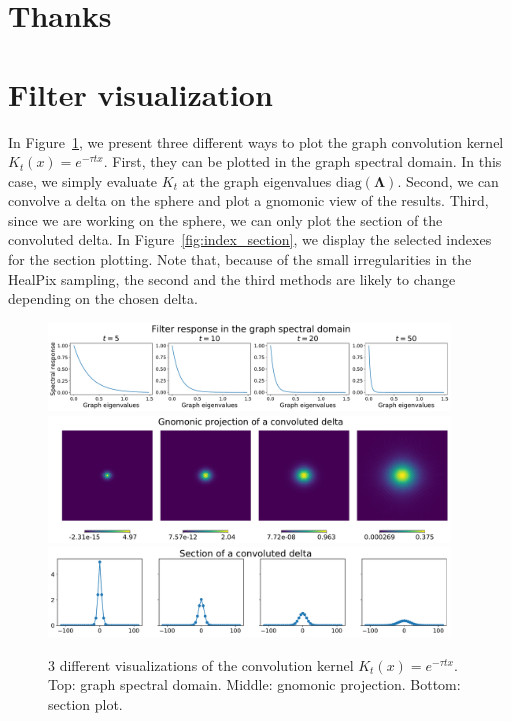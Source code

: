 \documentclass[final,twocolumn,3p,times,authoryear]{elsarticle}
\renewcommand{\b}[1]{{\bm{#1}}}   %
\newcommand{\1}{\b{1}}              %
\newcommand{\0}{\b{0}}              %
\newcommand{\bLambda}{\b{\Lambda}}
\begin{document}
\section*{Thanks}

\appendix

\section{Filter visualization}
\label{app:filter_visualization}

In Figure~\ref{fig:gaussian_filters_visualization}, we present three different
ways to plot the graph convolution kernel $K_t(x)=e^{-\tau t x}$. First, they can
be plotted in the graph spectral domain. In this case, we simply evaluate $K_t$
at the graph eigenvalues $\text{diag}(\bLambda)$. Second, we can convolve a
delta on the sphere and plot a gnomonic view of the results. Third, since we are
working on the sphere, we can only plot the section of the convoluted delta. In
Figure~\ref{fig:index_section}, we display the selected indexes for the section
plotting. Note that, because of the small irregularities in the HealPix
sampling, the second and the third methods are likely to change depending on the
chosen delta.

\begin{figure}[!ht]
\centering
\includegraphics[width=0.95\textwidth]{figures/gaussian_filters_spectral.pdf}
\includegraphics[width=0.95\textwidth]{figures/gaussian_filters_gnomonic.pdf}
\includegraphics[width=0.95\textwidth]{figures/gaussian_filters_section.pdf}
\caption{3 different visualizations of the convolution kernel $K_t(x)=e^{-\tau t x}$.
Top: graph spectral domain.
Middle: gnomonic projection.
Bottom: section plot.}
\label{fig:gaussian_filters_visualization}
\end{figure}
\end{document}
